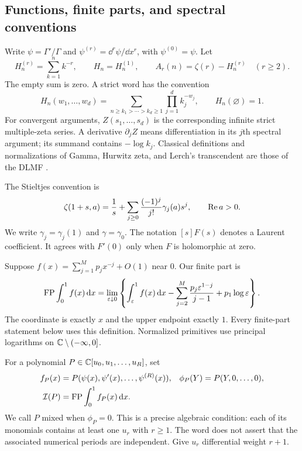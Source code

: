 \subsection{Functions, finite parts, and spectral conventions}

Write $\psi=\Gamma'/\Gamma$ and $\psi^{(r)}=\dd^r\psi/\dd x^r$,
with $\psi^{(0)}=\psi$. Let
\[
 H_n^{(r)}=\sum_{k=1}^n k^{-r},\qquad H_n=H_n^{(1)},\qquad
 A_r(n)=\zeta(r)-H_n^{(r)}\quad(r\ge2).
\]
The empty sum is zero. A strict word has the convention
\[
 H_n(w_1,\ldots,w_d)=
 \sum_{n\ge k_1>\cdots>k_d\ge1}\prod_{j=1}^d k_j^{-w_j},
 \qquad H_n(\varnothing)=1.
\]
For convergent arguments, $Z(s_1,\ldots,s_d)$ is the corresponding
infinite strict multiple-zeta series. A derivative $\partial_j Z$
means differentiation in its $j$th spectral argument; its summand contains
$-\log k_j$. Classical definitions and normalizations of Gamma, Hurwitz
zeta, and Lerch's transcendent are those of the DLMF
\cite{DLMFGamma,DLMFZeta,DLMFLerch}.

The Stieltjes convention is
\begin{equation}\label{poly:stieltjes}
 \zeta(1+s,a)=\frac1s+
 \sum_{j\ge0}\frac{(-1)^j}{j!}\gamma_j(a)s^j,
 \qquad \operatorname{Re} a>0.
\end{equation}
We write $\gamma_j=\gamma_j(1)$ and $\gamma=\gamma_0$.
The notation $[s]F(s)$ denotes a Laurent coefficient. It agrees with
$F'(0)$ only when $F$ is holomorphic at zero.

Suppose $f(x)=\sum_{j=1}^M p_jx^{-j}+O(1)$ near $0$. Our finite part is
\begin{equation}\label{poly:fp}
 \operatorname{FP}\int_0^1f(x)\,\mathrm d x=
 \lim_{\varepsilon\downarrow0}
 \left\{\int_\varepsilon^1f(x)\,\mathrm d x
 -\sum_{j=2}^M\frac{p_j\varepsilon^{1-j}}{j-1}
 +p_1\log\varepsilon\right\}.
\end{equation}
The coordinate is exactly $x$ and the upper endpoint exactly $1$.
Every finite-part statement below uses this definition. Normalized
primitives use principal logarithms on $\mathbb C\setminus(-\infty,0]$.

For a polynomial $P\in\mathbb C[u_0,u_1,\ldots,u_R]$, set
\begin{align*}
 f_P(x)&=P(\psi(x),\psi'(x),\ldots,\psi^{(R)}(x)),&
 \phi_P(Y)&=P(Y,0,\ldots,0),\\
 \mathcal I(P)&=\operatorname{FP}\int_0^1f_P(x)\,\mathrm d x.
\end{align*}
We call $P$ mixed when $\phi_P=0$. This is a precise algebraic condition:
each of its monomials contains at least one $u_r$ with $r\ge1$.
The word does not assert that the associated numerical periods are
independent. Give $u_r$ differential weight $r+1$.
